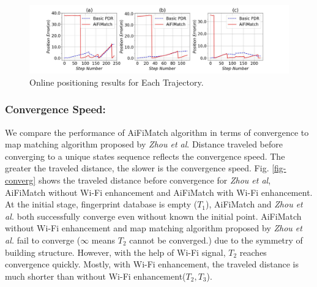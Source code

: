 \documentclass{llncs}
\begin{document}
\begin{figure}[!htbp]
	\centering
	\includegraphics[width=4.6in]{AiFiMatch-OnlinePosition}
	\caption{Online positioning results for Each Trajectory.}
	\label{fig-online}
\end{figure}



\subsubsection{Convergence Speed:}

We compare the performance of AiFiMatch algorithm in terms of convergence to map matching algorithm proposed by \emph{Zhou et al}. Distance traveled before converging to a unique states sequence reflects the convergence speed. The greater the traveled distance, the slower is the convergence speed. Fig. \ref{fig-converg} shows the traveled distance before convergence for \emph{Zhou et al}, AiFiMatch without Wi-Fi enhancement and AiFiMatch with Wi-Fi enhancement. At the initial stage, fingerprint database is empty ($T_1$), AiFiMatch and \emph{Zhou et al.} both successfully converge even without known the initial point. AiFiMatch without Wi-Fi enhancement and map matching algorithm proposed by \emph{Zhou et al.} fail to converge ($\infty$ means $T_2$ cannot be converged.) due to the symmetry of building structure. However, with the help of Wi-Fi signal, $T_2$ reaches convergence quickly. Mostly, with Wi-Fi enhancement, the traveled distance is much shorter than without Wi-Fi enhancement($T_2, T_3$). 

\end{document}

